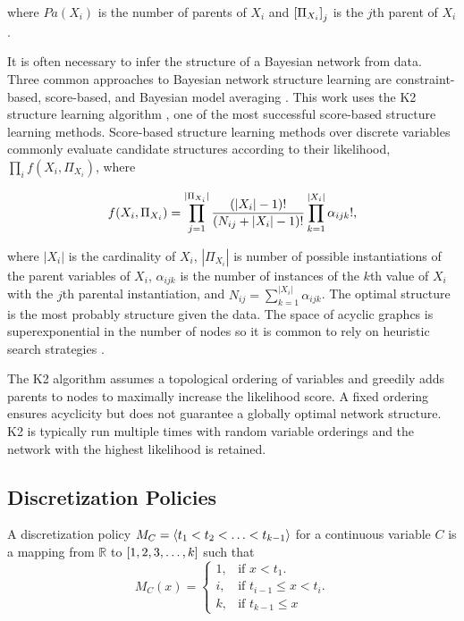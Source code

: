\noindent
where $Pa(X_i)$ is the number of parents of $X_i$ and $\brock{\Pi_{X_i}}_j$ is the $j$th parent of $X_i$.

It is often necessary to infer the structure of a Bayesian network from data.
Three common approaches to Bayesian network structure learning are constraint-based, score-based, and Bayesian model averaging \citep[see][chap.~18]{PGM_2009}. This work uses the K2 structure learning algorithm \citep{K2}, one of the most successful score-based structure learning methods.
Score-based structure learning methods over discrete variables commonly evaluate candidate structures according to their likelihood, $\prod_i f(X_i, \Pi_{X_i})$, where

\begin{align}
f(X_i, \Pi_{X_i}) = \prod_{j=1}^{|\Pi_{X_i}|} {{(|X_i|-1)!}\over{(N_{ij} + |X_i|-1)!}} \prod_{k=1}^{|X_i|} \alpha_{ijk}!\text{,}
\end{align}

\noindent
where $|X_i|$ is the cardinality of $X_i$, $|\Pi_{X_i}|$ is number of possible instantiations of the parent variables of $X_i$, $\alpha_{ijk}$ is the number of instances of the $k$th value of $X_i$ with the $j$th parental instantiation, and $N_{ij} = \sum_{k=1}^{|X_i|} \alpha_{ijk}$.
The optimal structure is the most probably structure given the data.
The space of acyclic graphcs is superexponential in the number of nodes so it is common to rely on heuristic search strategies \citep{PGM_2009}.

The K2 algorithm assumes a topological ordering of variables and greedily adds parents to nodes to maximally increase the likelihood score.
A fixed ordering ensures acyclicity but does not guarantee a globally optimal network structure.
K2 is typically run multiple times with random variable orderings and the network with the highest likelihood is retained.

\subsection{Discretization Policies}

A discretization policy $M_C = \langle t_1 < t_2 < \ldots < t_{k-1} \rangle$ for a continuous variable $C$ is a mapping from $\mathbb{R}$ to $\brock{1,2,3,\ldots,k}$ such that
\begin{equation}
  M_C (x)=\begin{cases}
    1, & \text{if $x<t_1$}.\\
    i, & \text{if $t_{i-1} \leq x < t_i$}\text{.}\\
    k, & \text{if $t_{k-1} \leq x$}
  \end{cases}
\end{equation}

